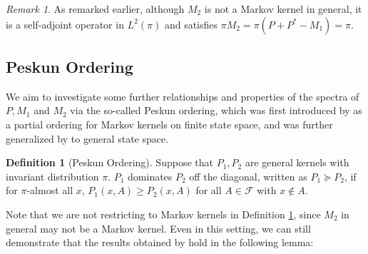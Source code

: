 \documentclass[12pt,a4]{amsart}
\numberwithin{equation}{section}
\theoremstyle{plain}
\theoremstyle{definition}
\newtheorem{definition}{Definition}[section]
\theoremstyle{remark}
\newtheorem{rk}{Remark}[section]
\newcommand{\1}{\mathds{1}}
\renewcommand{\geq}{\geqslant}
\begin{document}
\begin{rk}
	As remarked earlier, although $M_2$ is not a Markov kernel in general, it is a self-adjoint operator in $L^2(\pi)$ and satisfies $\pi M_2 = \pi (P + P^* - M_1) = \pi$.
\end{rk}


\subsection{Peskun Ordering}
We aim to investigate some further relationships and properties of the spectra of $P, M_1$ and $M_2$ via the so-called Peskun ordering, which was first introduced by \cite{Pesk73} as a partial ordering for Markov kernels on finite state space, and was further generalized by \cite{Tie98} to general state space.

\begin{definition}[Peskun Ordering]\label{def:peksun}
	Suppose that $P_1, P_2$ are general kernels with invariant distribution $\pi$. $P_1$ dominates $P_2$ off the diagonal, written as $P_1 \succeq P_2$, if for $\pi$-almost all $x$, $P_1(x,A) \geq P_2(x,A)$ for all $A \in \mathcal{F}$ with $x \notin A$.
\end{definition}

Note that we are not restricting to Markov kernels in Definition \ref{def:peksun}, since $M_2$ in general may not be a Markov kernel. Even in this setting, we can still demonstrate that the results obtained by \cite{Tie98} hold in the following lemma:
\end{document}

